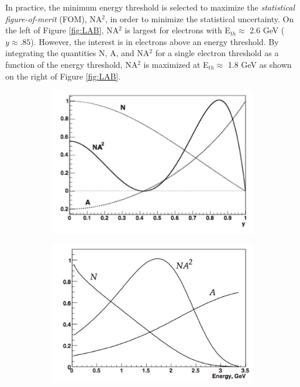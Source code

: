 \documentclass{outhesis}
\begin{document}
In practice, the minimum energy threshold is selected to maximize the \emph{statistical figure-of-merit} (FOM), NA$^2$, in order to minimize the statistical uncertainty. On the left of Figure \ref{fig:LAB}, NA$^2$ is largest for electrons with E$_{th}\approx$ 2.6 GeV ($y \approx .85$). However, the interest is in electrons above an energy threshold. By integrating the quantities N, A, and NA$^2$ for a single electron threshold as a function of the energy threshold, NA$^2$ is maximized at E$_{th}\approx$ 1.8 GeV as shown on the right of Figure \ref{fig:LAB}. 
\begin{figure}
\begin{subfigure}
  \centering
  \includegraphics[scale=0.5]{figures/NA_time}
  \end{subfigure}
\begin{subfigure}
  \centering
  \includegraphics[scale=0.44]{figures/NA_integrated}

\end{subfigure}
\end{figure}
\end{document}
